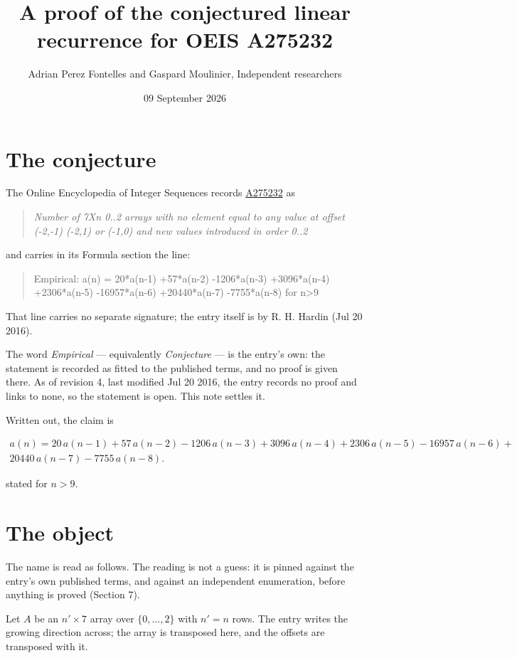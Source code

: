 \documentclass[11pt]{article}
\title{A proof of the conjectured linear recurrence for OEIS A275232}
\author{Adrian Perez Fontelles and Gaspard Moulinier, Independent researchers}
\date{09 September 2026}
\theoremstyle{definition}
\begin{document}
\maketitle
\section{The conjecture}

The Online Encyclopedia of Integer Sequences records \href{https://oeis.org/A275232}{A275232} as

\begin{quote}\itshape Number of 7Xn 0..2 arrays with no element equal to any value at offset (-2,-1) (-2,1) or (-1,0) and new values introduced in order 0..2\end{quote}

and carries in its Formula section the line:

\begin{quote}\ttfamily Empirical: a(n) = 20*a(n-1) +57*a(n-2) -1206*a(n-3) +3096*a(n-4) +2306*a(n-5) -16957*a(n-6) +20440*a(n-7) -7755*a(n-8) for n>9\end{quote}

That line carries no separate signature; the entry itself is by R. H. Hardin (Jul 20 2016).

The word {\itshape Empirical} --- equivalently {\itshape Conjecture} --- is the entry's own: the statement is recorded as fitted to the published terms, and no proof is given there. As of revision 4, last modified Jul 20 2016, the entry records no proof and links to none, so the statement is open. This note settles it.

Written out, the claim is

\begin{multline*} a(n) = 20\,a(n-1) + 57\,a(n-2) - 1206\,a(n-3) + 3096\,a(n-4) + 2306\,a(n-5) - 16957\,a(n-6) + \\ 20440\,a(n-7) - 7755\,a(n-8). \end{multline*}

stated for $n > 9$.

\section{The object}

The name is read as follows. The reading is not a guess: it is pinned against the entry's own published terms, and against an independent enumeration, before anything is proved (Section 7).

Let $A$ be an $n' \times 7$ array over $\{0,\dots,2\}$ with $n' = n$ rows. The entry writes the growing direction across; the array is transposed here, and the offsets are transposed with it.
\end{document}
